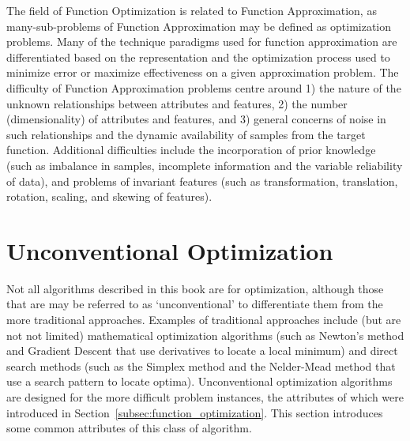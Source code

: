 \begin{bibunit}
The field of Function Optimization is related to Function Approximation, as many-sub-problems of Function Approximation may be defined as optimization problems. Many of the technique paradigms used for function approximation are differentiated based on the representation and the optimization process used to minimize error or maximize effectiveness on a given approximation problem. 
The difficulty of Function Approximation problems centre around 1) the nature of the unknown relationships between attributes and features, 2) the number (dimensionality) of attributes and features, and 3) general concerns of noise in such relationships and the dynamic availability of samples from the target function.
Additional difficulties include the incorporation of prior knowledge (such as imbalance in samples, incomplete information and the variable reliability of data), and problems of invariant features (such as transformation, translation, rotation, scaling, and skewing of features).


% 
% 
\section{Unconventional Optimization}
\label{sec:unconventional_optimization}
Not all algorithms described in this book are for optimization, although those that are may be referred to as `unconventional' to differentiate them from the more traditional approaches. Examples of traditional approaches include (but are not not limited) mathematical optimization algorithms (such as Newton's method and Gradient Descent that use derivatives to locate a local minimum) and direct search methods (such as the Simplex method and the Nelder-Mead method that use a search pattern to locate optima).
Unconventional optimization algorithms are designed for the more difficult problem instances, the attributes of which were introduced in Section~\ref{subsec:function_optimization}. This section introduces some common attributes of this class of algorithm.

% 
% 

\end{bibunit}
